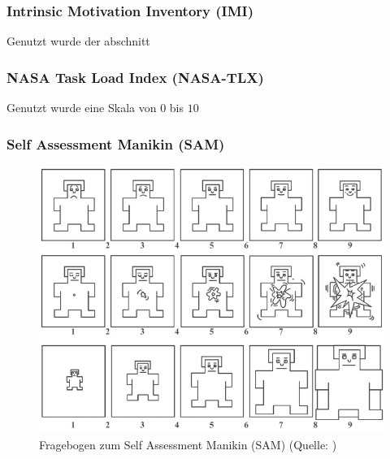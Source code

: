 \documentclass[
	12pt,
	a4paper,
	bibtotoc,
	cleardoubleempty, 
	idxtotoc,
	ngerman,
	openright
	final,
	listof=nochaptergap,
	]{scrbook}
\begin{document}
\begin{appendices}


\subsubsection{Intrinsic Motivation Inventory (IMI)}

Genutzt wurde der abschnitt 


\subsubsection{NASA Task Load Index (NASA-TLX)}

Genutzt wurde eine Skala von $0$ bis $10$



\subsubsection{Self Assessment Manikin (SAM)}



\begin{figure}[ht]
\centering
\includegraphics[width=1\linewidth]{content/attachments/questtionaires/Self-Assessment-Manikin-SAM-for-valence-arousal-and-dominance-The-five.png}
\caption{Fragebogen zum Self Assessment Manikin (SAM) (Quelle: \citealp{soares_affective_2013})}
\label{fig:append_sam}
\end{figure}




\end{appendices}
\end{document}
